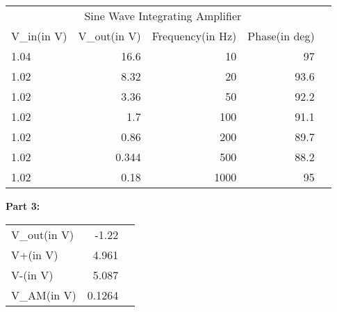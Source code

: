 \begin{table}[!htp]\centering
    \scriptsize
    \begin{tabular}{lrrrr}\toprule
        \multicolumn{4}{c}{Sine Wave Integrating Amplifier}           \\\cmidrule{1-4}
        V\_in(in V) & V\_out(in V) & Frequency(in Hz) & Phase(in deg) \\\midrule
        1.04        & 16.6         & 10               & 97            \\
        1.02        & 8.32         & 20               & 93.6          \\
        1.02        & 3.36         & 50               & 92.2          \\
        1.02        & 1.7          & 100              & 91.1          \\
        1.02        & 0.86         & 200              & 89.7          \\
        1.02        & 0.344        & 500              & 88.2          \\
        1.02        & 0.18         & 1000             & 95            \\
        \bottomrule
    \end{tabular}
\end{table}

{\large \textbf{Part 3:}}
\begin{table}[!htp]\centering
    \scriptsize
    \begin{tabular}{lrr}\toprule
        V\_out(in V) & -1.22  \\
        V+(in V)     & 4.961  \\
        V-(in V)     & 5.087  \\
        V\_AM(in V)  & 0.1264 \\
        \bottomrule
    \end{tabular}
\end{table}